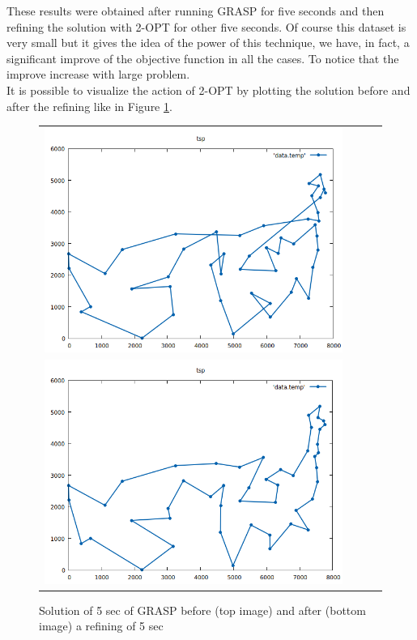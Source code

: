 \noindent These results were obtained after running GRASP for five seconds and then refining the solution with 2-OPT for other five seconds. Of course this dataset is very small but it gives the idea of the power of this technique, we have, in fact, a significant improve of the objective function in all the cases. To notice that the improve increase with large problem. \\
It is possible to visualize the action of 2-OPT by plotting the solution before and after the refining like in Figure \ref{fig:grasp}.

\begin{figure}[h!]
\centering
	\begin{tabular}{@{}cccc@{}}
		\includegraphics[scale=0.5]{media/before2opt.png} \\
		\includegraphics[scale=0.5]{media/after2opt.png} \\
	\end{tabular}
	\caption{Solution of 5 sec of GRASP before (top image) and after (bottom image) a refining of 5 sec}
	\label{fig:grasp}
\end{figure}


